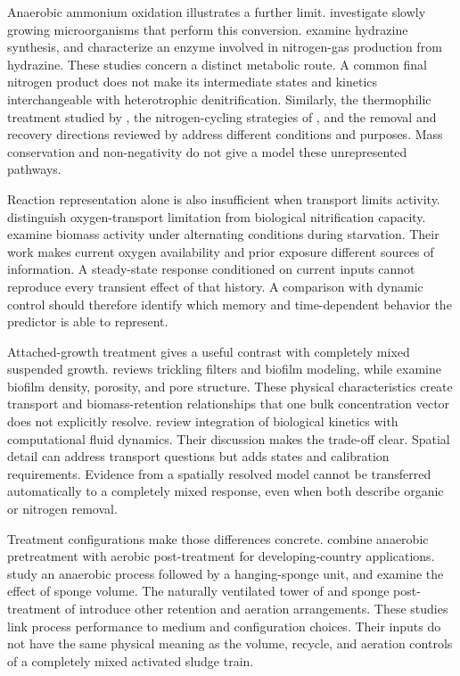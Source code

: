 Anaerobic ammonium oxidation illustrates a further limit. \citet{Strous1998} investigate slowly growing microorganisms that perform this conversion. \citet{Dietl2015} examine hydrazine synthesis, and \citet{Maalcke2016} characterize an enzyme involved in nitrogen-gas production from hydrazine. These studies concern a distinct metabolic route. A common final nitrogen product does not make its intermediate states and kinetics interchangeable with heterotrophic denitrification. Similarly, the thermophilic treatment studied by \citet{Vandekerckhove2018}, the nitrogen-cycling strategies of \citet{Xie2021}, and the removal and recovery directions reviewed by \citet{WinklerStraka2019} address different conditions and purposes. Mass conservation and non-negativity do not give a model these unrepresented pathways.

Reaction representation alone is also insufficient when transport limits activity. \citet{StenstromSong1991} distinguish oxygen-transport limitation from biological nitrification capacity. \citet{Yilmaz2007} examine biomass activity under alternating conditions during starvation. Their work makes current oxygen availability and prior exposure different sources of information. A steady-state response conditioned on current inputs cannot reproduce every transient effect of that history. A comparison with dynamic control should therefore identify which memory and time-dependent behavior the predictor is able to represent.

Attached-growth treatment gives a useful contrast with completely mixed suspended growth. \citet{Wik2003} reviews trickling filters and biofilm modeling, while \citet{Zhang1994} examine biofilm density, porosity, and pore structure. These physical characteristics create transport and biomass-retention relationships that one bulk concentration vector does not explicitly resolve. \citet{SadinoRiquelme2023} review integration of biological kinetics with computational fluid dynamics. Their discussion makes the trade-off clear. Spatial detail can address transport questions but adds states and calibration requirements. Evidence from a spatially resolved model cannot be transferred automatically to a completely mixed response, even when both describe organic or nitrogen removal.

Treatment configurations make those differences concrete. \citet{Machdar1997} combine anaerobic pretreatment with aerobic post-treatment for developing-country applications. \citet{Tawfik2006} study an anaerobic process followed by a hanging-sponge unit, and \citet{Tawfik2010} examine the effect of sponge volume. The naturally ventilated tower of \citet{Mahmoud2010} and sponge post-treatment of \citet{Mahmoud2011} introduce other retention and aeration arrangements. These studies link process performance to medium and configuration choices. Their inputs do not have the same physical meaning as the volume, recycle, and aeration controls of a completely mixed activated sludge train.

